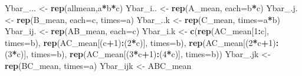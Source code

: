 \documentclass[
]{book}
\newenvironment{Shaded}{\begin{snugshade}}{\end{snugshade}}
\newcommand{\AttributeTok}[1]{\textcolor[rgb]{0.13,0.29,0.53}{#1}}
\newcommand{\DecValTok}[1]{\textcolor[rgb]{0.00,0.00,0.81}{#1}}
\newcommand{\FunctionTok}[1]{\textcolor[rgb]{0.13,0.29,0.53}{\textbf{#1}}}
\newcommand{\NormalTok}[1]{#1}
\newcommand{\OtherTok}[1]{\textcolor[rgb]{0.56,0.35,0.01}{#1}}
\newcommand{\SpecialCharTok}[1]{\textcolor[rgb]{0.81,0.36,0.00}{\textbf{#1}}}
\begin{document}
\begin{Shaded}
\begin{Highlighting}[]
\NormalTok{Ybar\_... }\OtherTok{\textless{}{-}} \FunctionTok{rep}\NormalTok{(allmean,a}\SpecialCharTok{*}\NormalTok{b}\SpecialCharTok{*}\NormalTok{c)}
\NormalTok{Ybar\_i.. }\OtherTok{\textless{}{-}} \FunctionTok{rep}\NormalTok{(A\_mean, }\AttributeTok{each=}\NormalTok{b}\SpecialCharTok{*}\NormalTok{c)}
\NormalTok{Ybar\_.j. }\OtherTok{\textless{}{-}} \FunctionTok{rep}\NormalTok{(B\_mean, }\AttributeTok{each=}\NormalTok{c, }\AttributeTok{times=}\NormalTok{a)}
\NormalTok{Ybar\_..k }\OtherTok{\textless{}{-}} \FunctionTok{rep}\NormalTok{(C\_mean, }\AttributeTok{times=}\NormalTok{a}\SpecialCharTok{*}\NormalTok{b)}
\NormalTok{Ybar\_ij. }\OtherTok{\textless{}{-}} \FunctionTok{rep}\NormalTok{(AB\_mean, }\AttributeTok{each=}\NormalTok{c)}
\NormalTok{Ybar\_i.k }\OtherTok{\textless{}{-}} \FunctionTok{c}\NormalTok{(}\FunctionTok{rep}\NormalTok{(AC\_mean[}\DecValTok{1}\SpecialCharTok{:}\NormalTok{c], }\AttributeTok{times=}\NormalTok{b),}
              \FunctionTok{rep}\NormalTok{(AC\_mean[(c}\SpecialCharTok{+}\DecValTok{1}\NormalTok{)}\SpecialCharTok{:}\NormalTok{(}\DecValTok{2}\SpecialCharTok{*}\NormalTok{c)], }\AttributeTok{times=}\NormalTok{b),}
              \FunctionTok{rep}\NormalTok{(AC\_mean[(}\DecValTok{2}\SpecialCharTok{*}\NormalTok{c}\SpecialCharTok{+}\DecValTok{1}\NormalTok{)}\SpecialCharTok{:}\NormalTok{(}\DecValTok{3}\SpecialCharTok{*}\NormalTok{c)], }\AttributeTok{times=}\NormalTok{b),}
              \FunctionTok{rep}\NormalTok{(AC\_mean[(}\DecValTok{3}\SpecialCharTok{*}\NormalTok{c}\SpecialCharTok{+}\DecValTok{1}\NormalTok{)}\SpecialCharTok{:}\NormalTok{(}\DecValTok{4}\SpecialCharTok{*}\NormalTok{c)], }\AttributeTok{times=}\NormalTok{b))}
\NormalTok{Ybar\_.jk }\OtherTok{\textless{}{-}} \FunctionTok{rep}\NormalTok{(BC\_mean, }\AttributeTok{times=}\NormalTok{a)}
\NormalTok{Ybar\_ijk }\OtherTok{\textless{}{-}}\NormalTok{ ABC\_mean}


\end{Highlighting}
\end{Shaded}
\end{document}
